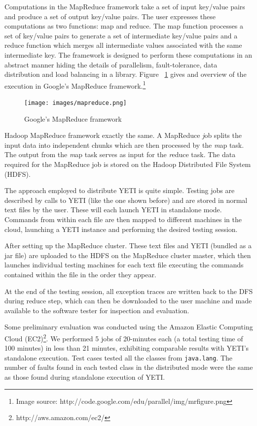 \documentclass [a4paper, 11pt, twoside] {report}
\begin{document}
Computations in the MapReduce framework take a set of input key/value pairs and produce a set of output key/value pairs. The user expresses these computations as two functions: map and reduce. The map function processes a set of key/value pairs to generate a set of intermediate key/value pairs and a reduce function which merges all intermediate values associated with the same intermediate key. The framework is designed to perform these computations in an abstract manner hiding the details of parallelism, fault-tolerance, data distribution and load balancing in a library. Figure ~\ref{fig:mapreduce}  gives and overview of the execution in Google's MapReduce framework.\footnote{ Image source: http://code.google.com/edu/parallel/img/mrfigure.png}  

\begin{figure}[h]
\begin{center}
\texttt{[image: images/mapreduce.png]}
\end{center}
\caption{Google's MapReduce framework}\label{fig:mapreduce}
\end{figure}


Hadoop MapReduce framework exactly the same. A MapReduce \emph job splits the input data into independent chunks which are then processed by the \emph map task. The output from the \emph map task serves as input for the \emph reduce task. The data required for the MapReduce job is stored on the Hadoop Distributed File System (HDFS).  

The approach employed to distribute YETI is quite simple. Testing jobs are described by calls to YETI (like the one shown before) and are stored in normal text files by the user. These will each launch YETI in standalone mode. Commands from within each file are then mapped to different machines in the cloud, launching a YETI instance and performing the desired testing session. 

After setting up the MapReduce cluster. These text files and YETI (bundled as a jar file) are uploaded to the 
HDFS on the MapReduce cluster master, which then launches individual testing machines for each text file executing the commands contained within the file in the order they appear.

At the end of the testing session, all exception traces are written back to the DFS during reduce step, which can then be downloaded to the user machine and made available to the software tester for inspection and evaluation.

Some preliminary evaluation was conducted using the Amazon Elastic Computing Cloud (EC2)\footnote{http://aws.amazon.com/ec2/}. We performed 5 jobs of 20-minutes each (a total testing time of 100 minutes) in less than 21 minutes, exhibiting comparable results with YETI's standalone execution. 
Test cases tested all the classes from \texttt{java.lang}. The number of faults found in each tested class in the distributed mode were the same as those found during standalone execution of YETI. 
\end{document}
